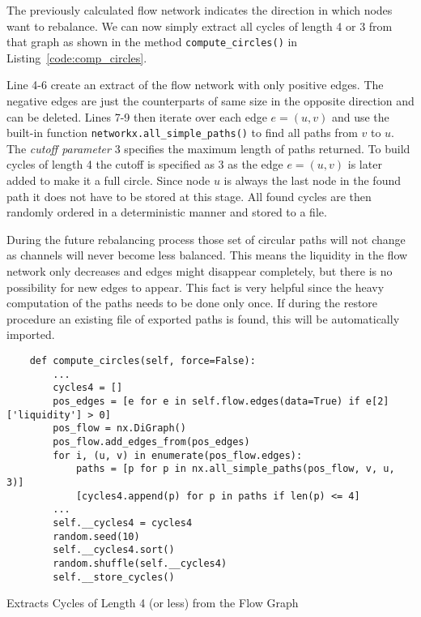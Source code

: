 \documentclass[final]{fhnwreport}       %
\begin{document}
The previously calculated flow network indicates the direction in which nodes want to rebalance. We can now simply extract all cycles of length 4 or 3 from that graph as shown in the method \texttt{compute_circles()} in Listing~\ref{code:comp_circles}. 

Line 4-6 create an extract of the flow network with only positive edges. The negative edges are just the counterparts of same size in the opposite direction and can be deleted. Lines 7-9 then iterate over each edge $e = (u, v)$ and use the built-in function \texttt{networkx.all_simple_paths()} to find all paths from $v$ to $u$. The \emph{cutoff parameter} 3 specifies the maximum length of paths returned. To build cycles of length 4 the cutoff is specified as 3 as the edge $e = (u, v)$ is later added to make it a full circle. Since node $u$ is always the last node in the found path it does not have to be stored at this stage. All found cycles are then randomly ordered in a deterministic manner and stored to a file. 

During the future rebalancing process those set of circular paths will not change as channels will never become less balanced. This means the liquidity in the flow network only decreases and edges might disappear completely, but there is no possibility for new edges to appear. This fact is very helpful since the heavy computation of the paths needs to be done only once. If during the restore procedure an existing file of exported paths is found, this will be automatically imported.

\begin{listing}[H]
  \begin{verbatim}
    def compute_circles(self, force=False):
        ...
        cycles4 = []
        pos_edges = [e for e in self.flow.edges(data=True) if e[2]['liquidity'] > 0]
        pos_flow = nx.DiGraph()
        pos_flow.add_edges_from(pos_edges)
        for i, (u, v) in enumerate(pos_flow.edges):
            paths = [p for p in nx.all_simple_paths(pos_flow, v, u, 3)]
            [cycles4.append(p) for p in paths if len(p) <= 4]
        ...
        self.__cycles4 = cycles4
        random.seed(10)
        self.__cycles4.sort()
        random.shuffle(self.__cycles4)
        self.__store_cycles()
  \end{verbatim}
  \caption{Extracts Cycles of Length 4 (or less) from the Flow Graph}
  \label{code:comp_circles}
\end{listing}
\end{document}
